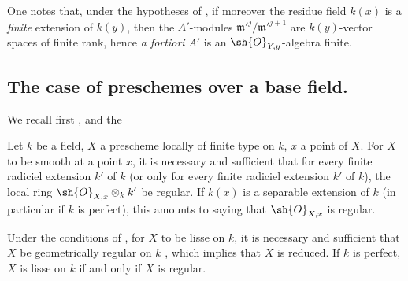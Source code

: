 \begin{remark}[17.14.3]
\label{IV.17.14.3}
One notes that, under the hypotheses of , if moreover the residue field $k(x)$ is a \emph{finite} extension of $k(y)$, then the $A'$-modules $\mathfrak{m}'^j/\mathfrak{m}'^{j+1}$ are $k(y)$-vector spaces of finite rank, hence \emph{a fortiori} $A'$ is an $\sh{O}_{Y,y}$-algebra finite.
\end{remark}


\subsection{The case of preschemes over a base field.}
\label{subsection:IV.17.15}


We recall first ,  and  the

\begin{proposition}[17.15.1]
\label{IV.17.15.1}
Let $k$ be a field, $X$ a prescheme locally of finite type on $k$, $x$ a point of $X$.
For $X$ to be smooth at a point $x$, it is necessary and sufficient that for every finite radiciel extension $k'$ of $k$ (or only for every finite radiciel extension $k'$ of $k$), the local ring $\sh{O}_{X,x}\otimes_k k'$ be regular.
If $k(x)$ is a separable extension of $k$ (in particular if $k$ is perfect), this amounts to saying that $\sh{O}_{X,x}$ is regular.
\end{proposition}

\begin{corollary}[17.15.2]
\label{IV.17.15.2}
Under the conditions of , for $X$ to be lisse on $k$, it is necessary and sufficient that $X$ be geometrically regular on $k$ , which implies that $X$ is reduced.
If $k$ is perfect, $X$ is lisse on $k$ if and only if $X$ is regular.
\end{corollary}

